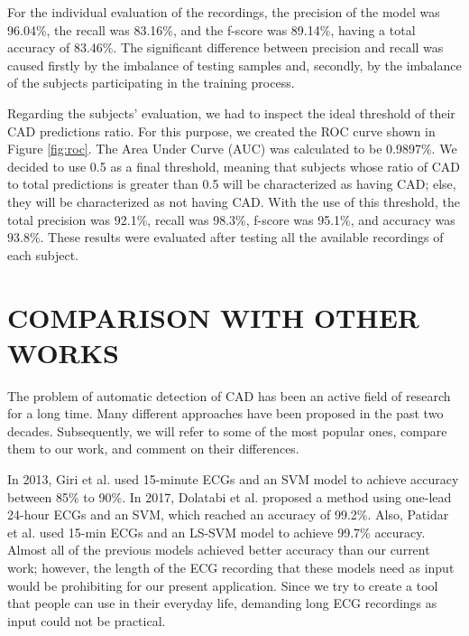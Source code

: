 For the individual evaluation of the recordings, the precision of the model was 96.04\%, the recall was 83.16\%, and the f-score was 89.14\%, having a total accuracy of 83.46\%. The significant difference between precision and recall was caused firstly by the imbalance of testing samples and, secondly, by the imbalance of the subjects participating in the training process.

Regarding the subjects' evaluation, we had to inspect the ideal threshold of their CAD predictions ratio. For this purpose, we created the ROC curve shown in Figure \ref{fig:roc}. The Area Under Curve (AUC) was calculated to be 0.9897\%. We decided to use 0.5 as a final threshold, meaning that subjects whose ratio of CAD to total predictions is greater than 0.5 will be characterized as having CAD; else, they will be characterized as not having CAD. With the use of this threshold, the total precision was 92.1\%, recall was 98.3\%, f-score was 95.1\%, and accuracy was 93.8\%. These results were evaluated after testing all the available recordings of each subject.

\section{COMPARISON WITH OTHER WORKS}
\label{sec:comparison}

The problem of automatic detection of CAD has been an active field of research for a long time. Many different approaches have been proposed in the past two decades. Subsequently, we will refer to some of the most popular ones, compare them to our work, and comment on their differences.

In 2013, Giri et al. \cite{giri} used 15-minute ECGs and an SVM model to achieve accuracy between 85\% to 90\%. In 2017, Dolatabi et al. \cite{dolatabadi} proposed a method using one-lead 24-hour ECGs and an SVM, which reached an accuracy of 99.2\%. Also, Patidar et al. \cite{patidar} used 15-min ECGs and an LS-SVM model to achieve 99.7\% accuracy. Almost all of the previous models achieved better accuracy than our current work; however, the length of the ECG recording that these models need as input would be prohibiting for our present application. Since we try to create a tool that people can use in their everyday life, demanding long ECG recordings as input could not be practical.

